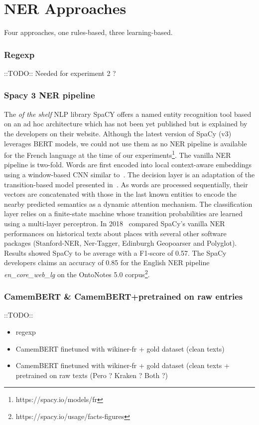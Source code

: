 \section{NER Approaches}
Four approaches, one rules-based, three learning-based.

\subsubsection{Regexp}
::TODO::
Needed for experiment 2 ?

\subsubsection{Spacy 3 NER pipeline}
The \textit{of the shelf} NLP library SpaCY offers a named entity recognition tool based on an ad hoc architecture which has not been yet published but is explained by the developers on their website. Although the latest version of SpaCy (v3) leverages BERT models, we could not use them as no NER pipeline is available for the French language at the time of our experiments\footnote{https://spacy.io/models/fr}.
The vanilla NER pipeline is two-fold. Words are first encoded into local context-aware embeddings using a window-based CNN similar to~\cite{collobert2011}.
The decision layer is an adaptation of the transition-based model presented in~\cite{lample2016}.
As words are processed sequentially, their vectors are concatenated with those in the last known entities to encode the nearby predicted semantics as a dynamic attention mechanism.
The classification layer relies on a finite-state machine whose transition probabilities are learned using a multi-layer perceptron.
In 2018~\cite{won2018} compared SpaCy's vanilla NER performances on historical texts about places with several other software packages (Stanford-NER, Ner-Tagger, Edinburgh Geopoarser and Polyglot). Results showed SpaCy to be average with a F1-score of 0.57.
The SpaCy developers claims an accuracy of 0.85 for the English NER pipeline \textit{en\_core\_web\_lg} on the OntoNotes 5.0 corpus\footnote{https://spacy.io/usage/facts-figures}.

\subsubsection{CamemBERT \& CamemBERT+pretrained on raw entries}
::TODO::

\begin{itemize}
    \item regexp
    \item CamemBERT finetuned with wikiner-fr + gold dataset (clean texts)
    \item CamemBERT finetuned with wikiner-fr + gold dataset (clean texts + pretrained on raw texts (Pero ? Kraken ? Both ?)
\end{itemize}


